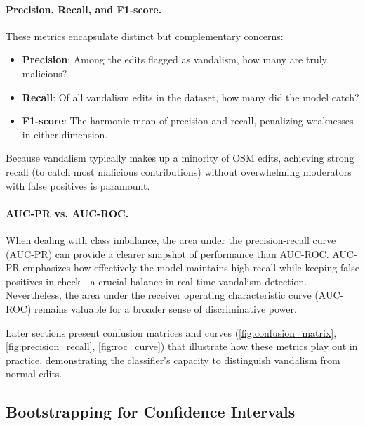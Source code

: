 \documentclass[
    13pt, %
    a4paper, %
    listof=totoc, %
    bibliography=totoc, %
    index=totoc, %
    headsepline
]{scrreprt}
\begin{document}
\paragraph{Precision, Recall, and F1-score.}
These metrics encapsulate distinct but complementary concerns:
\begin{itemize}
    \item \textbf{Precision}: Among the edits flagged as vandalism, how many are truly malicious?  
    \item \textbf{Recall}: Of all vandalism edits in the dataset, how many did the model catch?  
    \item \textbf{F1-score}: The harmonic mean of precision and recall, penalizing weaknesses in either dimension.
\end{itemize}
Because vandalism typically makes up a minority of OSM edits, achieving strong recall (to catch most malicious contributions) without overwhelming moderators with false positives is paramount.

\paragraph{AUC-PR vs. AUC-ROC.}
\noindent
When dealing with class imbalance, the area under the precision-recall curve (AUC-PR) can provide a clearer snapshot of performance than AUC-ROC. AUC-PR emphasizes how effectively the model maintains high recall while keeping false positives in check—a crucial balance in real-time vandalism detection. Nevertheless, the area under the receiver operating characteristic curve (AUC-ROC) remains valuable for a broader sense of discriminative power.

\noindent
Later sections present confusion matrices and curves (\autoref{fig:confusion_matrix}, \autoref{fig:precision_recall}, \autoref{fig:roc_curve}) that illustrate how these metrics play out in practice, demonstrating the classifier’s capacity to distinguish vandalism from normal edits.

\subsection{Bootstrapping for Confidence Intervals}
\label{sec:bootstrapping_for_ci}
\end{document}
